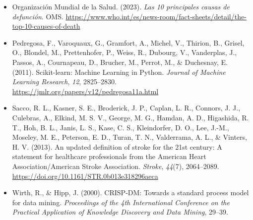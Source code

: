 \documentclass[12pt,a4paper]{article}
\begin{document}
{\begin{itemize}[leftmargin=1.2cm, itemsep=0.6em, label={}]
    \item Organización Mundial de la Salud. (2023). \textit{Las 10 principales causas de defunción}. OMS. \url{https://www.who.int/es/news-room/fact-sheets/detail/the-top-10-causes-of-death}

    \item Pedregosa, F., Varoquaux, G., Gramfort, A., Michel, V., Thirion, B., Grisel, O., Blondel, M., Prettenhofer, P., Weiss, R., Dubourg, V., Vanderplas, J., Passos, A., Cournapeau, D., Brucher, M., Perrot, M., \& Duchesnay, E. (2011). Scikit-learn: Machine Learning in Python. \textit{Journal of Machine Learning Research}, \textit{12}, 2825--2830. \url{https://jmlr.org/papers/v12/pedregosa11a.html}

    \item Sacco, R. L., Kasner, S. E., Broderick, J. P., Caplan, L. R., Connors, J. J., Culebras, A., Elkind, M. S. V., George, M. G., Hamdan, A. D., Higashida, R. T., Hoh, B. L., Janis, L. S., Kase, C. S., Kleindorfer, D. O., Lee, J.-M., Moseley, M. E., Peterson, E. D., Turan, T. N., Valderrama, A. L., \& Vinters, H. V. (2013). An updated definition of stroke for the 21st century: A statement for healthcare professionals from the American Heart Association/American Stroke Association. \textit{Stroke}, \textit{44}(7), 2064--2089. \url{https://doi.org/10.1161/STR.0b013e318296aeca}

    \item Wirth, R., \& Hipp, J. (2000). CRISP-DM: Towards a standard process model for data mining. \textit{Proceedings of the 4th International Conference on the Practical Application of Knowledge Discovery and Data Mining}, 29--39.

\end{itemize}
}
\end{document}

